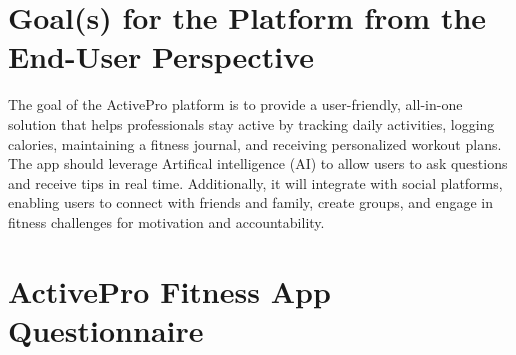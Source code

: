 \documentclass[letterpaper,11pt]{texMemo} %
\begin{document}
\maketitle %

\section{Goal(s) for the Platform from the End-User Perspective}

The goal of the ActivePro platform is to provide a user-friendly, all-in-one solution that helps professionals stay active by tracking daily activities, logging calories, maintaining a fitness journal, and receiving personalized workout plans. The app should leverage Artifical intelligence (AI) to allow users to ask questions and receive tips in real time. Additionally, it will integrate with social platforms, enabling users to connect with friends and family, create groups, and engage in fitness challenges for motivation and accountability.


\section{ActivePro Fitness App Questionnaire}
  	
\end{document}

